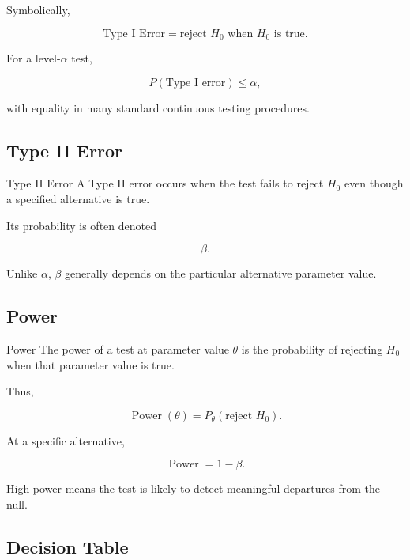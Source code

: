 Symbolically,

\[
\boxed{
\text{Type I Error}
=
\text{reject }H_0
\text{ when }H_0\text{ is true}.
}
\]

For a level-\(\alpha\) test,

\[
\boxed{
P(\text{Type I error})
\leq
\alpha,
}
\]

with equality in many standard continuous testing procedures.

\subsection{Type II Error}
\label{subsec:type-ii-error}

\begin{definitionbox}{Type II Error}
A Type II error occurs when the test fails to reject \(H_0\) even though
a specified alternative is true.
\end{definitionbox}

Its probability is often denoted

\[
\boxed{
\beta.
}
\]

Unlike \(\alpha\), \(\beta\) generally depends on the particular
alternative parameter value.

\subsection{Power}
\label{subsec:test-power}

\begin{definitionbox}{Power}
The power of a test at parameter value \(\theta\) is the probability of
rejecting \(H_0\) when that parameter value is true.
\end{definitionbox}

Thus,

\[
\boxed{
\operatorname{Power}(\theta)
=
P_\theta(\text{reject }H_0).
}
\]

At a specific alternative,

\[
\boxed{
\operatorname{Power}
=
1-\beta.
}
\]

High power means the test is likely to detect meaningful departures from
the null.

\subsection{Decision Table}
\label{subsec:hypothesis-decision-table}

